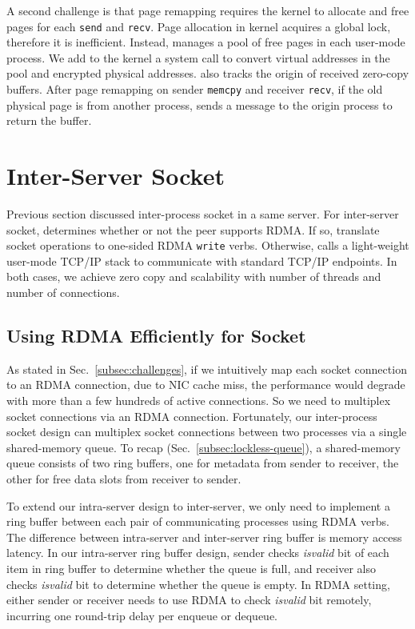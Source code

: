 A second challenge is that page remapping requires the kernel to allocate and free pages for each \texttt{send} and \texttt{recv}. Page allocation in kernel acquires a global lock, therefore it is inefficient. Instead, \libipc{} manages a pool of free pages in each user-mode process.
We add to the kernel a system call to convert virtual addresses in the pool and encrypted physical addresses.
\libipc{} also tracks the origin of received zero-copy buffers.
After page remapping on sender \texttt{memcpy} and receiver \texttt{recv}, if the old physical page is from another process, \libipc{} sends a message to the origin process to return the buffer.


\section{Inter-Server Socket}
\label{sec:rdma}

Previous section discussed inter-process socket in a same server. For inter-server socket, \libipc{} determines whether or not the peer supports RDMA. If so, \libipc{} translate socket operations to one-sided RDMA \texttt{write} verbs. Otherwise, \libipc{} calls a light-weight user-mode TCP/IP stack to communicate with standard TCP/IP endpoints. In both cases, we achieve zero copy and scalability with number of threads and number of connections.

\subsection{Using RDMA Efficiently for Socket}

As stated in Sec.~\ref{subsec:challenges}, if we intuitively map each socket connection to an RDMA connection, due to NIC cache miss, the performance would degrade with more than a few hundreds of active connections. So we need to multiplex socket connections via an RDMA connection. %
Fortunately, our inter-process socket design can multiplex socket connections between two processes via a single shared-memory queue. To recap (Sec.~\ref{subsec:lockless-queue}), a shared-memory queue consists of two ring buffers, one for metadata from sender to receiver, the other for free data slots from receiver to sender.

To extend our intra-server design to inter-server, we only need to implement a ring buffer between each pair of communicating processes using RDMA verbs. The difference between intra-server and inter-server ring buffer is memory access latency. In our intra-server ring buffer design, sender checks \textit{isvalid} bit of each item in ring buffer to determine whether the queue is full, and receiver also checks \textit{isvalid} bit to determine whether the queue is empty. In RDMA setting, either sender or receiver needs to use RDMA to check \textit{isvalid} bit remotely, incurring one round-trip delay per enqueue or dequeue.

